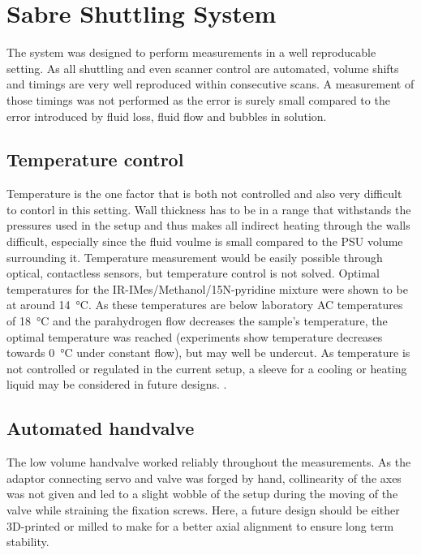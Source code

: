     \section{Sabre Shuttling System}
        The system was designed to perform measurements in a well reproducable setting. As all shuttling and even scanner control are automated, volume shifts and timings are very well reproduced within consecutive scans. A measurement of those timings was not performed as the error is surely small compared to the error introduced by fluid loss, fluid flow and bubbles in solution.

        \subsection{Temperature control}
        \label{cd:sabreShuttling:tempControl}
            Temperature is the one factor that is both not controlled and also very difficult to contorl in this setting. Wall thickness has to be in a range that withstands the pressures used in the setup and thus makes all indirect heating through the walls difficult, especially since the fluid voulme is small compared to the PSU volume surrounding it. Temperature measurement would be easily possible through optical, contactless sensors, but temperature control is not solved. Optimal temperatures for the IR-IMes/Methanol/15N-pyridine mixture were shown to be at around \SI{14}{\celsius}. As these temperatures are below laboratory AC temperatures of \SI{18}{\celsius} and the parahydrogen flow decreases the sample's temperature, the optimal temperature was reached (experiments show temperature decreases towards \SI{0}{\celsius} under constant flow), but may well be undercut. As temperature is not controlled or regulated in the current setup, a sleeve for a cooling or heating liquid may be considered in future designs. .
        \subsection{Automated handvalve}
        The low volume handvalve worked reliably throughout the measurements. As the adaptor connecting servo and valve was forged by hand, collinearity of the axes was not given and led to a slight wobble of the setup during the moving of the valve while straining the fixation screws. Here, a future design should be either 3D-printed or milled to make for a better axial alignment to ensure long term stability.
